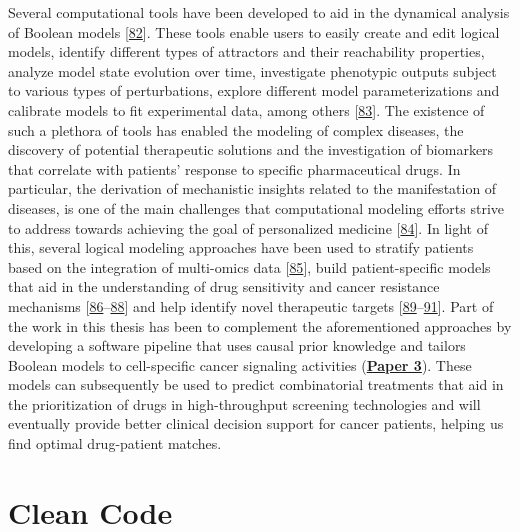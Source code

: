 \documentclass[
  12pt,
]{book}
\begin{document}
\newpage

Several computational tools have been developed to aid in the dynamical analysis of Boolean models {[}\protect\hyperlink{ref-Abou-Jaoude2016}{82}{]}.
These tools enable users to easily create and edit logical models, identify different types of attractors and their reachability properties, analyze model state evolution over time, investigate phenotypic outputs subject to various types of perturbations, explore different model parameterizations and calibrate models to fit experimental data, among others {[}\protect\hyperlink{ref-Naldi2018a}{83}{]}.
The existence of such a plethora of tools has enabled the modeling of complex diseases, the discovery of potential therapeutic solutions and the investigation of biomarkers that correlate with patients' response to specific pharmaceutical drugs.
In particular, the derivation of mechanistic insights related to the manifestation of diseases, is one of the main challenges that computational modeling efforts strive to address towards achieving the goal of personalized medicine {[}\protect\hyperlink{ref-Hood2011}{84}{]}.
In light of this, several logical modeling approaches have been used to stratify patients based on the integration of multi-omics data {[}\protect\hyperlink{ref-Beal2018}{85}{]}, build patient-specific models that aid in the understanding of drug sensitivity and cancer resistance mechanisms {[}\protect\hyperlink{ref-Eduati2017}{86}--\protect\hyperlink{ref-Tognetti2021}{88}{]} and help identify novel therapeutic targets {[}\protect\hyperlink{ref-Saadatpour2011}{89}--\protect\hyperlink{ref-Eduati2020}{91}{]}.
Part of the work in this thesis has been to complement the aforementioned approaches by developing a software pipeline that uses causal prior knowledge and tailors Boolean models to cell-specific cancer signaling activities (\textbf{\protect\hyperlink{Paper3}{Paper 3}}).
These models can subsequently be used to predict combinatorial treatments that aid in the prioritization of drugs in high-throughput screening technologies and will eventually provide better clinical decision support for cancer patients, helping us find optimal drug-patient matches.

\newpage

\hypertarget{clean-code}{%
\section*{Clean Code}\label{clean-code}}

\indent
\end{document}
